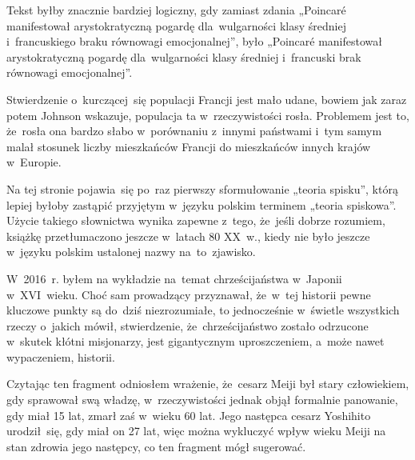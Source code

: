 \documentclass[a4paper,11pt]{article}
\begin{document}
\vspace{\spaceFour}


\start {} Tekst byłby znacznie bardziej logiczny, gdy
zamiast zdania „Poincar\'{e} manifestował arystokratyczną pogardę
dla~wulgarności klasy średniej i~francuskiego braku równowagi
emocjonalnej”, było „Poincar\'{e} manifestował arystokratyczną
pogardę dla~wulgarności klasy średniej i~francuski brak równowagi
emocjonalnej”.

\vspace{\spaceFour}


\start {} Stwierdzenie o~kurczącej~się populacji Francji jest
mało udane, bowiem jak zaraz potem Johnson wskazuje, populacja ta
w~rzeczywistości rosła. Problemem jest to, że~rosła ona bardzo słabo
w~porównaniu z~innymi państwami i~tym samym malał stosunek liczby
mieszkańców Francji do mieszkańców innych krajów w~Europie.

\vspace{\spaceFour}


\start {} Na tej stronie pojawia~się po~raz pierwszy
sformułowanie „teoria spisku”, którą lepiej byłoby zastąpić
przyjętym w~języku polskim terminem „teoria spiskowa”. Użycie
takiego słownictwa wynika zapewne z~tego, że~jeśli dobrze rozumiem,
książkę przetłumaczono jeszcze w~latach 80 XX~w., kiedy nie było
jeszcze w~języku polskim ustalonej nazwy na~to~zjawisko.

\vspace{\spaceFour}


\start {}

\vspace{\spaceFour}


\start {} W~2016~r. byłem na wykładzie na~temat chrześcijaństwa
w~Japonii w~XVI~wieku. Choć sam prowadzący przyznawał, że~w~tej
historii pewne kluczowe punkty są do~dziś niezrozumiałe, to
jednocześnie w~świetle wszystkich rzeczy o~jakich mówił, stwierdzenie,
że~chrześcijaństwo zostało odrzucone w~skutek kłótni misjonarzy, jest
gigantycznym uproszczeniem, a~może nawet wypaczeniem, historii.

\vspace{\spaceFour}


\start {} Czytając ten fragment odniosłem wrażenie, że~cesarz
Meiji był stary człowiekiem, gdy sprawował swą władzę,
w~rzeczywistości jednak objął formalnie panowanie, gdy miał 15 lat,
zmarł zaś w~wieku 60 lat. Jego następca cesarz Yoshihito urodził~się,
gdy miał on 27 lat, więc można wykluczyć wpływ wieku Meiji na stan
zdrowia jego następcy, co ten fragment mógł sugerować.
\end{document}
